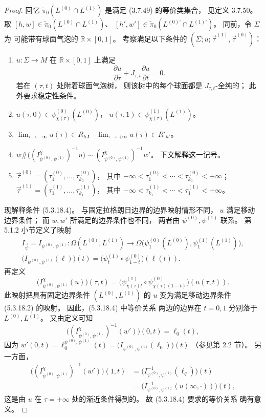 \begin{proof}
回忆 $\widetilde\pi_0
(L^{(0)}\cap L^{(1)})$
是满足 (3.7.49) 的等价类集合，
见定义 3.7.50。
取
$[h,w]\in\widetilde\pi_0
(L^{(0)}\cap L^{(1)})$、
$[h',w']\in\widetilde\pi_0
(L^{(0)\prime}\cap L^{(1)\prime})$。
同前，令 $\Sigma$ 为
可能带有球面气泡的
$\mathbb R\times[0,1]$。
考察满足以下条件的
$(\Sigma;u;\vec\tau^{(1)},\vec\tau^{(0)})$：
\begin{enumerate}[
 label=\textup{(5.3.18.\arabic*)},
 leftmargin=6.3em]
\item\label{cond:5-3-18-1}
$u\colon\Sigma\to M$
在 $\mathbb R\times[0,1]$ 上满足
\[
\frac{\partial u}{\partial\tau}
+J_{\tau,t}\frac{\partial u}{\partial t}=0.
\]
若在 $(\tau,t)$ 处附着球面气泡树，
则该树中的每个球面都是
$J_{\tau,t}$-全纯的；
此外要求稳定性条件。
\item\label{cond:5-3-18-2}
$u(\tau,0)\in
\psi^{(0)}_{\chi(\tau)}(L^{(0)})$，
$u(\tau,1)\in
\psi^{(1)}_{\chi(\tau)}(L^{(1)})$。
\item\label{cond:5-3-18-3}
$\lim_{\tau\to-\infty}u(\tau)\in R_h$，
$\lim_{\tau\to+\infty}u(\tau)\in R'_{h'}$。
\item\label{cond:5-3-18-4}
$w\#\bigl(
(I^\chi_{\psi^{(0)},\psi^{(1)}})^{-1}u
\bigr)
\sim
(I^\chi_{\psi^{(0)},\psi^{(1)}})^{-1}w'$。
下文解释这一记号。
\item\label{cond:5-3-18-5}
$\vec\tau^{(0)}
=(\tau_1^{(0)},\ldots,\tau_{k_0}^{(0)})$，
其中
$-\infty<\tau_1^{(0)}<\cdots<
 \tau_{k_0}^{(0)}<+\infty$；
$\vec\tau^{(1)}
=(\tau_1^{(1)},\ldots,\tau_{k_1}^{(1)})$，
其中
$-\infty<\tau_{k_1}^{(1)}<\cdots<
 \tau_1^{(1)}<+\infty$。
\end{enumerate}
现解释条件 (5.3.18.4)。
与固定拉格朗日边界的边界映射情形不同，
$u$ 满足移动边界条件；
而 $w,w'$ 所满足的边界条件也不同，
两者由 $\psi^{(0)},\psi^{(1)}$ 联系。
第 5.1.2 小节定义了映射
\[
\begin{aligned}
I_{\vec\psi}
=I_{\psi^{(0)},\psi^{(1)}}\colon
\Omega(L^{(0)},L^{(1)})
\longrightarrow
\Omega\bigl(
\psi^{(0)}_1(L^{(0)}),
\psi^{(1)}_1(L^{(1)})\bigr),
\\[-1mm]
\bigl(I_{\psi^{(0)},\psi^{(1)}}(\ell)\bigr)(t)
=\bigl(\psi^{(1)}_t\circ
\psi^{(0)}_{1-t}\bigr)(\ell(t)).
\end{aligned}
\]
再定义
\[
\bigl(I^\chi_{\psi^{(0)},\psi^{(1)}}(u)
\bigr)(\tau,t)
=\bigl(
\psi^{(1)}_{\chi(\tau)t}
\circ\psi^{(0)}_{\chi(\tau)(1-t)}
\bigr)(u(\tau,t)).
\]
此映射把具有固定边界条件
$(L^{(0)},L^{(1)})$ 的 $u$
变为满足移动边界条件
(5.3.18.2) 的映射。
因此，(5.3.18.4) 中等价关系
两边的边界在 $t=0,1$
分别落于 $L^{(0)},L^{(1)}$。
又由定义可知
\[
\bigl(
(I^\chi_{\psi^{(0)},\psi^{(1)}})^{-1}
(w')\bigr)(0,t)=\ell_0(t),
\]
因为
$w'(0,t)=
\ell_0^{\psi^{(0)},\psi^{(1)}}(t)
=\bigl(
I_{\psi^{(0)},\psi^{(1)}}(\ell_0)
\bigr)(t)$
（参见第 2.2 节）。
另一方面，
\[
\begin{aligned}
\bigl(
(I^\chi_{\psi^{(0)},\psi^{(1)}})^{-1}
(w')\bigr)(1,t)
&=\bigl(
I_{\psi^{(0)},\psi^{(1)}}^{-1}(\ell_q)
\bigr)(t)
\\
&=\bigl(
I_{\psi^{(0)},\psi^{(1)}}^{-1}
(u(\infty,\cdot))
\bigr)(t),
\end{aligned}
\]
这是由 $u$ 在 $\tau=+\infty$
处的渐近条件得到的。
故 (5.3.18.4) 要求的等价关系
确有意义。


\end{proof}
